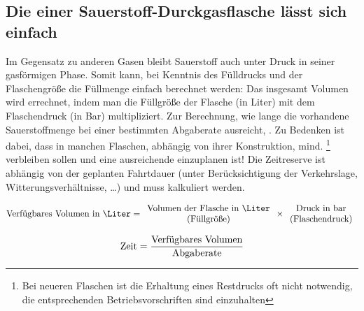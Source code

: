 \bigskip


\subsection{Die  einer Sauerstoff-Durckgasflasche lässt sich einfach }

\Text
{{\TxBeschreibung}}%
{%
Im Gegensatz zu anderen Gasen bleibt Sauerstoff auch unter Druck in seiner gasförmigen Phase. 
%
Somit kann, 
bei Kenntnis des Fülldrucks 
und der Flaschengröße die Füllmenge einfach berechnet werden: 
%
Das insgesamt  Volumen wird errechnet, 
indem man
die Füllgröße der Flasche (in Liter) 
mit dem
Flaschendruck (in Bar) 
multipliziert. 
%
Zur Berechnung, 
wie lange die vorhandene Sauerstoffmenge bei einer bestimmten
Abgaberate ausreicht, 
.
%
Zu Bedenken ist dabei, 
dass in manchen Flaschen, 
abhängig von ihrer Konstruktion, 
mind. \footnote{Bei neueren Flaschen ist die Erhaltung eines Restdrucks oft nicht notwendig, die entsprechenden Betriebsvorschriften sind einzuhalten} 
verbleiben sollen 
und eine ausreichende  einzuplanen ist! 
%
Die Zeitreserve ist abhängig von der geplanten Fahrtdauer 
(unter Berücksichtigung der Verkehrslage, Witterungsverhältnisse, {\ldots}) und muss  kalkuliert werden.  

{\FontSansNarrowFamily
\begin{equation}\notag
\text{Verfügbares Volumen in \Liter} = {\begin{array}{c}
\text{Volumen der Flasche in \Liter}\\
\text{(Füllgröße)} \end{array}}
\times 
\begin{array}{c}{\text{Druck in bar}}\\
\text{(Flaschendruck)}
\end{array}\notag
\end{equation}

\begin{equation}\notag
\text{Zeit} = 
\frac{\text{Verfügbares Volumen}}{\text{Abgaberate}}
\notag
\end{equation}
}
% 




}%




